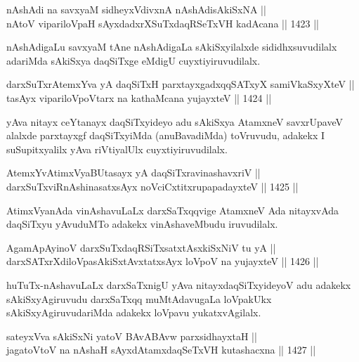 \begin{shl}
nAshAdi na savxyaM sidheyxVdivxnA nAshAdisAkiSxNA || \\
nAtoV vipariloVpaH sAyxdadxrXSuTxdaqRSeTxVH kadAcana \hfill || 1423 ||  
\end{shl}

\begin{artha}
nAshAdigaLu savxyaM tAne nAshAdigaLa sAkiSxyilalxde sididhxsuvudilalx adariMda sAkiSxya daqSiTxge eMdigU cuyxtiyiruvudilalx.
\end{artha}


\begin{shl}
darxSuTxrAtemxYva yA daqSiTxH parxtayxgadxqqSATxyX samiVkaSxyXteV ||  \\
tasAyx vipariloVpoV\s tarx na kathaMcana yujayxteV \hfill || 1424 ||  
\end{shl}

\begin{artha}
yAva nitayx ceYtanayx daqSiTxyideyo adu sAkiSxya AtamxneV savxrUpaveV alalxde parxtayxgf daqSiTxyiMda (anuBavadiMda) toVruvudu, adakekx I suSupitxyalilx yAva riVtiyalUlx cuyxtiyiruvudilalx.
\end{artha}

\begin{shl}
AtemxYvA\s \s timxVyaBUtasayx yA daqSiTxravinashavxriV || \\
darxSuTxviRnAshinasatxsAyx noVciCxtitxrupapadayxteV \hfill || 1425 ||  
\end{shl}

\begin{artha}
AtimxVyanAda vinAshavuLaLx darxSaTxqqvige AtamxneV Ada nitayxvAda daqSiTxyu yAvuduMTo adakekx vinAshaveMbudu iruvudilalx.
\end{artha}

\begin{shl}
AgamApAyinoV darxSuTxdaqRSiTxsatxtAsxkiSxNiV tu yA || \\
darxSATxrXdiloVpasAkiSxtAvxtatxsAyx loVpoV na yujayxteV \hfill || 1426 ||  
\end{shl}

\begin{artha}
huTuTx-nAshavuLaLx darxSaTxnigU yAva nitayxdaqSiTxyideyoV adu adakekx sAkiSxyAgiruvudu darxSaTxqq muMtAdavugaLa loVpakUkx sAkiSxyAgiruvudariMda adakekx loVpavu yukatxvAgilalx.
\end{artha}

\begin{shl}
sateyxVva sAkiSxNi yatoV BAvABAvw parxsidhayxtaH || \\
jagatoV\s toV na nAshaH sAyxdAtamxdaqSeTxVH kutashacxna \hfill || 1427 ||  
\end{shl}


